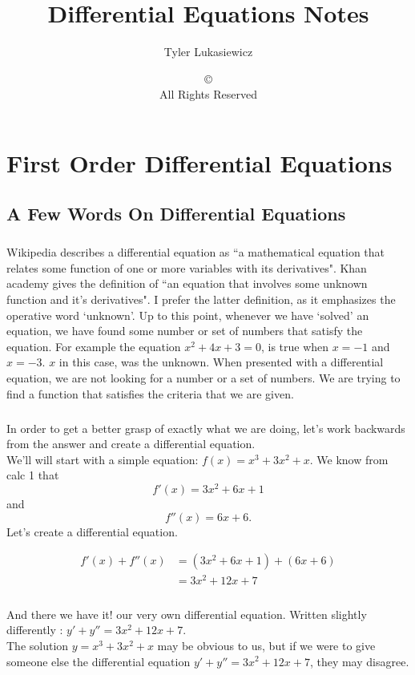 \documentclass[font =22]{report}
\title{Differential Equations Notes}
\author{Tyler Lukasiewicz}
\date{\copyright\;2014\\All Rights Reserved}
\begin{document}
\maketitle
\tableofcontents

\chapter{First Order Differential Equations}
\section{A Few Words On Differential Equations}
\paragraph{}
Wikipedia describes a differential equation as ``a mathematical equation that relates some function of one or more variables with its derivatives".
Khan academy gives the definition of ``an equation that involves some unknown function and it's derivatives". I prefer the latter definition, as it emphasizes the operative word `unknown'. Up to this point, whenever we have `solved' an equation, we have found some number  or set of numbers that satisfy the equation. For example the equation $x^2+4x+3  = 0$, is true when $x=-1$ and $x=-3$. $x$ in this case, was the unknown. When presented with a differential equation, we are not looking for a number or a set of numbers. We are trying to find a function that satisfies the criteria that we are given. 

\paragraph{}
In order to get a better grasp of exactly what we are doing, let's work backwards from the answer and create a differential equation.
\\
We'll will start with a simple equation: $f(x) = x^3 + 3x^2 +x$.
We know from calc 1 that \[f'(x) = 3x^2 + 6x +1 \]
and \[ f''(x) = 6x+6. \]
Let's create a differential equation.

\begin{align*}
f'(x) +f''(x) &= (3x^2 + 6x +1) +  (6x+6) 
\\&= 3x^2 +12x+7 
\end{align*}
\paragraph{}
And there we have it! our very own differential equation. Written slightly differently :
$y'+y'' = 3x^2 +12x+7$.\\
The solution $y = x^3 + 3x^2 +x$ may be obvious to us, but if we were to give someone else the differential equation $y'+y'' = 3x^2 +12x+7$, they may disagree.
\end{document}
